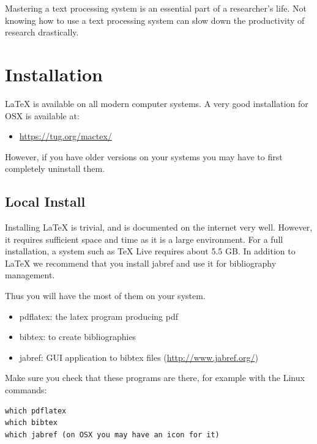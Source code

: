 \FILENAME

Mastering a text processing system is an essential part of a
researcher's life. Not knowing how to use a text processing system can
slow down the productivity of research drastically.

\section{Installation}
\label{installation}

LaTeX is available on all modern computer systems. A very good
installation for OSX is available at:

\begin{itemize}
\item
  \url{https://tug.org/mactex/}
\end{itemize}


However, if you have older versions on your systems you may have to
first completely uninstall them.

\subsection{Local Install}\label{local-install}

Installing LaTeX is trivial, and is documented on the internet very
well. However, it requires sufficient space and time as it is a large
environment. For a full installation, a system such as TeX Live requires about 5.5
GB. In addition to LaTeX we recommend that you install jabref and use it
for bibliography management.

Thus you will have the most of them on your system.

\begin{itemize}

\item
  pdflatex: the latex program producing pdf
\item
  bibtex: to create bibliographies
\item
  jabref: GUI application to bibtex files (\url{http://www.jabref.org/})
\end{itemize}

Make sure you check that these programs are there, for example with the
Linux commands:

\begin{verbatim}
which pdflatex
which bibtex
which jabref (on OSX you may have an icon for it)
\end{verbatim}

